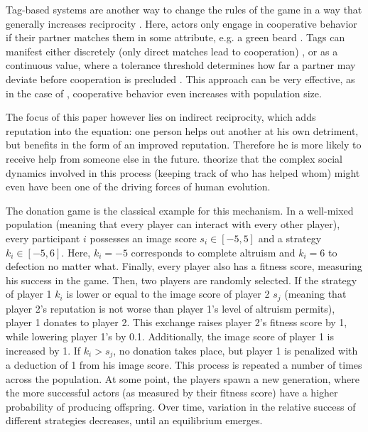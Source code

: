 \documentclass{JASSS}
\begin{document}
Tag-based systems are another way to change the rules of the game in a way that generally increases reciprocity \citep{Hamilton1964,Axelrod2004,Spector2006, Cohen2012, Shutters2013}. Here, actors only engage in cooperative behavior if their partner matches them in some attribute, e.g. a green beard \citep{Dawkins1976}. Tags can manifest either discretely (only direct matches lead to cooperation) \citep{Axelrod2004}, or as a continuous value, where a tolerance threshold determines how far a partner may deviate before cooperation is precluded \citep{Shutters2013, Shutters2015}. This approach can be very effective, as in the case of \cite{Shutters2015}, cooperative behavior even increases with population size.

The focus of this paper however lies on indirect reciprocity, which adds reputation into the equation: one person helps out another at his own detriment, but benefits in the form of an improved reputation. Therefore he is more likely to receive help from someone else in the future. \cite{Nowak1998} theorize that the complex social dynamics involved in this process (keeping track of who has helped whom) might even have been one of the driving forces of human evolution.

The donation game is the classical example for this mechanism. In a well-mixed population (meaning that every player can interact with every other player), every participant $i$ possesses an image score $s_i \in [-5,5]$ and a strategy $k_i \in [-5,6]$. Here, $k_i=-5$ corresponds to complete altruism and $k_i=6$ to defection no matter what. Finally, every player also has a fitness score, measuring his success in the game. Then, two players are randomly selected. If the strategy of player 1 $k_i$ is lower or equal to the image score of player 2 $s_j$ (meaning that player 2's reputation is not worse than player 1's level of altruism permits), player 1 donates to player 2. This exchange raises player 2's fitness score by 1, while lowering player 1's by 0.1. Additionally, the image score of player 1 is increased by 1. If $k_i>s_j$, no donation takes place, but player 1 is penalized with a deduction of 1 from his image score. This process is repeated a number of times across the population. At some point, the players spawn a new generation, where the more successful actors (as measured by their fitness score) have a higher probability of producing offspring. Over time, variation in the relative success of different strategies decreases, until an equilibrium emerges.
\end{document}
